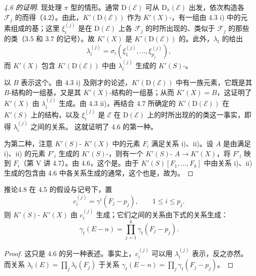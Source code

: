 \begin{proof}[ 4.6 的证明]
现处理 $\pi$ 型的情形。通常 $\mathrm D(\mathcal E)$ 可从 $\mathrm D_\pi(\mathcal E)$ 出发，依次构造各 $\mathcal F_j$ 的而得（4.2）。由此，$K'(\mathrm D(\mathcal E))$ 作为 $K'(X)$-，有一组由 4.3 i) 中的元素组成的基；这里 $\xi_i^{(j)}$ 是在 $\mathrm D(\mathcal E)$ 上各 $\mathcal F_j$ 的时所出现的、类似于 $\mathcal F_j$ 的那些的类（3.5 和 3.7 的记号）。故 $K'(X)$ 是 $K'(\mathrm D(\mathcal E))$ 的。此外，$\lambda_t$ 的给出
\[
\lambda_i^{(j)}=\sigma_i(\xi_1^{(j)},\ldots,\xi_{p_j}^{(j)}),
\]
而 $K'(X)$ 包含 $K'(\mathrm D(\mathcal E))$ 中由 $\lambda_i^{(j)}$ 生成的 $K'(S)$-。

以 $B$ 表示这个。由 4.3 i) 及刚才的论述，$K'(\mathrm D(\mathcal E))$ 中有一族元素，它既是其 $B$-结构的一组基，又是其 $K'(X)$-结构的一组基；从而 $K'(X)=B$，这证明了 $K'(X)$ 由 $\lambda_i^{(j)}$ 生成。由 4.3 ii)，再结合 4.7 所确定的 $K'(\mathrm D(\mathcal E))$ 在 $K'(S)$ 上的结构，以及 $\xi_i^{(j)}$ 是 $\mathcal E$ 在 $\mathrm D(\mathcal E)$ 上的时所出现的的类这一事实，即得 $\lambda_i^{(j)}$ 之间的关系。
这就证明了 4.6 的第一种。

为第二种，注意 $K'(S)$- $K'(X)$ 中的元素 $F_i$ 满足关系 i)、ii)。设 $A$ 是由满足 i)、ii) 的元素 $F'_i$ 生成的 $K'(S)$-，则有一个 $K'(S)$- $A\longrightarrow K'(X)$，将 $F'_i$ 映到 $F_i$（第 V 讲 4.7）。由 4.6，这个是。由于 $K'(S)[F_1,\ldots,F_k]$ 中由关系 i)、ii) 生成的包含由 4.6 中各关系生成的通常，这个也是，故为。
\end{proof}

\begin{SGAresult}{推论}{4.8}
在 4.5 的假设与记号下，置
\[
c_i^{(j)}=\gamma^i(F_j-p_j),\qquad 1\leq i\leq p_j.
\]
则 $K'(S)$- $K'(X)$ 由 $c_i^{(j)}$ 生成；它们之间的关系由下式的关系生成：
\[
\gamma_t(E-n)=\prod_{j=1}^k\gamma_t(F_j-p_j).
\]
\end{SGAresult}
\begin{proof}
这只是 4.6 的另一种表述。事实上，$c_i^{(j)}$ 可以用 $\lambda_i^{(j)}$ 表示，反之亦然。而关系 $\lambda_t(E)=\prod_j\lambda_t(F_j)$ 于关系 $\gamma_t(E-n)=\prod_j\gamma_t(F_j-p_j)$。
\end{proof}

